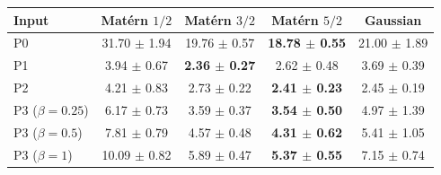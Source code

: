 \begin{tabular}{lcccc}
\toprule
Input & Mat\'ern $1/2$ & Mat\'ern $3/2$ & Mat\'ern $5/2$ & Gaussian \\
\midrule
P0 & 31.70 $\pm$ 1.94 & 19.76 $\pm$ 0.57 & \textbf{18.78 $\pm$ 0.55} & 21.00 $\pm$ 1.89 \\
P1 & 3.94 $\pm$ 0.67 & \textbf{2.36 $\pm$ 0.27} & 2.62 $\pm$ 0.48 & 3.69 $\pm$ 0.39 \\
P2 & 4.21 $\pm$ 0.83 & 2.73 $\pm$ 0.22 & \textbf{2.41 $\pm$ 0.23} & 2.45 $\pm$ 0.19 \\
P3 ($\beta = 0.25$) & 6.17 $\pm$ 0.73 & 3.59 $\pm$ 0.37 & \textbf{3.54 $\pm$ 0.50} & 4.97 $\pm$ 1.39 \\
P3 ($\beta = 0.5$) & 7.81 $\pm$ 0.79 & 4.57 $\pm$ 0.48 & \textbf{4.31 $\pm$ 0.62} & 5.41 $\pm$ 1.05 \\
P3 ($\beta = 1$) & 10.09 $\pm$ 0.82 & 5.89 $\pm$ 0.47 & \textbf{5.37 $\pm$ 0.55} & 7.15 $\pm$ 0.74 \\
\bottomrule
\end{tabular}

